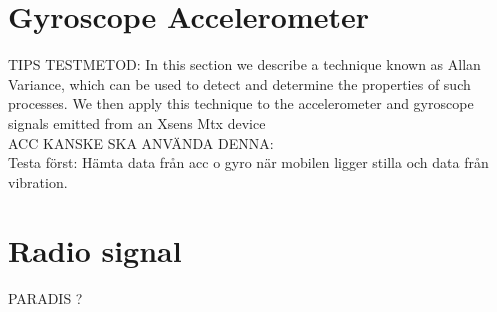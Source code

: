 \section{Gyroscope Accelerometer}\label{sec:test:gyro}
TIPS TESTMETOD: In this section we describe a technique known as Allan Variance, which can be used to detect and determine the properties of such processes. We then apply this technique to the accelerometer and gyroscope signals emitted from an Xsens Mtx device \cite[]{sensor:inertialNav} \\
ACC KANSKE SKA ANVÄNDA DENNA: \cite[]{sensor:micSpek} \\

Testa först:
Hämta data från acc o gyro när mobilen ligger stilla och data från vibration.

\section{Radio signal}\label{sec:test:rff}
PARADIS ?
